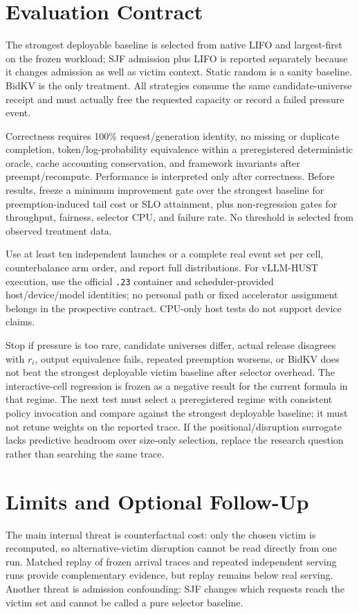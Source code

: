 \documentclass[10pt,twocolumn]{article}
\begin{document}
\section{Evaluation Contract}
The strongest deployable baseline is selected from native LIFO and largest-first on the frozen workload; SJF admission plus LIFO is reported separately because it changes admission as well as victim context. Static random is a sanity baseline. BidKV is the only treatment. All strategies consume the same candidate-universe receipt and must actually free the requested capacity or record a failed pressure event.

Correctness requires 100\% request/generation identity, no missing or duplicate completion, token/log-probability equivalence within a preregistered deterministic oracle, cache accounting conservation, and framework invariants after preempt/recompute. Performance is interpreted only after correctness. Before results, freeze a minimum improvement gate over the strongest baseline for preemption-induced tail cost or SLO attainment, plus non-regression gates for throughput, fairness, selector CPU, and failure rate. No threshold is selected from observed treatment data.

Use at least ten independent launches or a complete real event set per cell, counterbalance arm order, and report full distributions. For vLLM-HUST execution, use the official \texttt{.23} container and scheduler-provided host/device/model identities; no personal path or fixed accelerator assignment belongs in the prospective contract. CPU-only host tests do not support device claims.

Stop if pressure is too rare, candidate universes differ, actual release disagrees with $r_i$, output equivalence fails, repeated preemption worsens, or BidKV does not beat the strongest deployable victim baseline after selector overhead. The interactive-cell regression is frozen as a negative result for the current formula in that regime. The next test must select a preregistered regime with consistent policy invocation and compare against the strongest deployable baseline; it must not retune weights on the reported trace. If the positional/disruption surrogate lacks predictive headroom over size-only selection, replace the research question rather than searching the same trace.

\section{Limits and Optional Follow-Up}
The main internal threat is counterfactual cost: only the chosen victim is recomputed, so alternative-victim disruption cannot be read directly from one run. Matched replay of frozen arrival traces and repeated independent serving runs provide complementary evidence, but replay remains below real serving. Another threat is admission confounding: SJF changes which requests reach the victim set and cannot be called a pure selector baseline.
\end{document}

